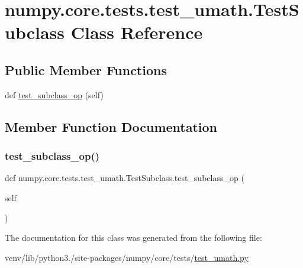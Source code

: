 \hypertarget{classnumpy_1_1core_1_1tests_1_1test__umath_1_1TestSubclass}{}\section{numpy.\+core.\+tests.\+test\+\_\+umath.\+Test\+Subclass Class Reference}
\label{classnumpy_1_1core_1_1tests_1_1test__umath_1_1TestSubclass}
\subsection*{Public Member Functions}
\begin{DoxyCompactItemize}
\item 
def \hyperlink{classnumpy_1_1core_1_1tests_1_1test__umath_1_1TestSubclass_aa759b7c2067758ab14b7623badaa1b1d}{test\+\_\+subclass\+\_\+op} (self)
\end{DoxyCompactItemize}


\subsection{Member Function Documentation}
\mbox{\label{classnumpy_1_1core_1_1tests_1_1test__umath_1_1TestSubclass_aa759b7c2067758ab14b7623badaa1b1d}} 
\subsubsection{\texorpdfstring{test\+\_\+subclass\+\_\+op()}{test\_subclass\_op()}}
{\footnotesize\ttfamily def numpy.\+core.\+tests.\+test\+\_\+umath.\+Test\+Subclass.\+test\+\_\+subclass\+\_\+op (\begin{DoxyParamCaption}\item[{}]{self }\end{DoxyParamCaption})}



The documentation for this class was generated from the following file\+:\begin{DoxyCompactItemize}
\item 
venv/lib/python3./site-\/packages/numpy/core/tests/\hyperlink{test__umath_8py}{test\+\_\+umath.\+py}\end{DoxyCompactItemize}
